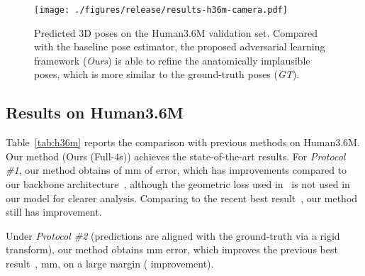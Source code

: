 \documentclass[10pt,twocolumn,letterpaper]{article}
\begin{document}
\begin{figure*}\begin{center}
		\texttt{[image: ./figures/release/results-h36m-camera.pdf]}
	\end{center}
	\vspace{-1em}
	\caption{Predicted 3D poses on the Human3.6M validation set. 
		Compared with the baseline pose estimator, the proposed adversarial learning framework (\textit{Ours}) is able to refine the anatomically implausible poses, which is more similar to the ground-truth poses (\textit{GT}). }
	\vspace{-1em}
	\label{fig:h36m}
\end{figure*}



\subsection{Results on Human3.6M}
Table~\ref{tab:h36m} reports the comparison with previous methods on Human3.6M. 
Our method  (\ie Ours (Full-4s)) achieves the state-of-the-art results. 
For \textit{Protocol \#1}, our method obtains  of mm of error, which has  improvements compared to our backbone architecture~\cite{zhou2017towards}, although the geometric loss used in~\cite{zhou2017towards} is not used in our model for clearer analysis. 
Comparing to the recent best result~\cite{fang2017learning}, our method still has  improvement.

Under \textit{Protocol \#2} (predictions are aligned with the ground-truth via a rigid transform), our method obtains mm error, which improves the previous best result~\cite{fang2017learning}, mm, on a large margin ( improvement).  
\end{document}
